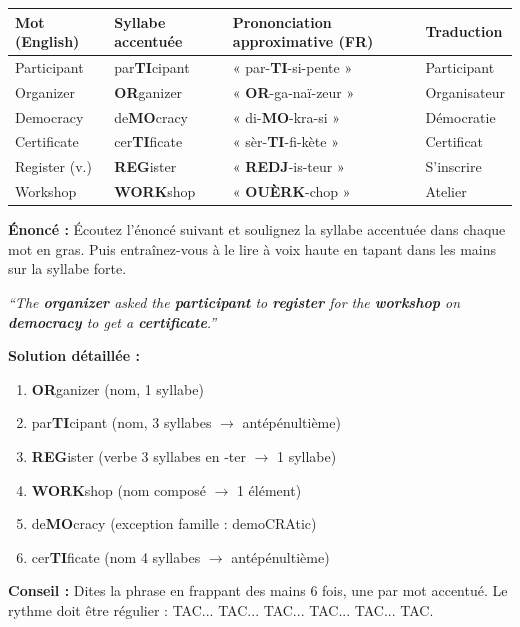 \documentclass[11pt]{article}
\newcommand{\cle}[1]{{\popxbold\color{popdark}#1}}
\begin{document}
\begin{center}
\begin{tabularx}{\linewidth}{|X|X|X|X|}
\hline
\rowcolor{popblueL} \textbf{Mot (English)} & \textbf{Syllabe accentuée} & \textbf{Prononciation approximative (FR)} & \textbf{Traduction} \\
\hline
Participant & par\textbf{TI}cipant & « par-\textbf{TI}-si-pente » & Participant \\
\hline
Organizer & \textbf{OR}ganizer & « \textbf{OR}-ga-naï-zeur » & Organisateur \\
\hline
Democracy & de\textbf{MO}cracy & « di-\textbf{MO}-kra-si » & Démocratie \\
\hline
Certificate & cer\textbf{TI}ficate & « sèr-\textbf{TI}-fi-kète » & Certificat \\
\hline
Register (v.) & \textbf{REG}ister & « \textbf{REDJ}-is-teur » & S'inscrire \\
\hline
Workshop & \textbf{WORK}shop & « \textbf{OUÈRK}-chop » & Atelier \\
\hline
\end{tabularx}
\end{center}

\begin{exoresolu}
\textbf{Énoncé :} Écoutez l'énoncé suivant et soulignez la syllabe accentuée dans chaque mot en gras. Puis entraînez-vous à le lire à voix haute en tapant dans les mains sur la syllabe forte.

\textit{``The \textbf{organizer} asked the \textbf{participant} to \textbf{register} for the \textbf{workshop} on \textbf{democracy} to get a \textbf{certificate}.''}

\tcblower
\textbf{Solution détaillée :}
\begin{enumerate}
    \item \textbf{OR}ganizer (nom, 1 syllabe)
    \item par\textbf{TI}cipant (nom, 3 syllabes $\to$ antépénultième)
    \item \textbf{REG}ister (verbe 3 syllabes en -ter $\to$ 1 syllabe)
    \item \textbf{WORK}shop (nom composé $\to$ 1 élément)
    \item de\textbf{MO}cracy (exception famille : demo\cle{CRA}tic)
    \item cer\textbf{TI}ficate (nom 4 syllabes $\to$ antépénultième)
\end{enumerate}
\textbf{Conseil :} Dites la phrase en frappant des mains 6 fois, une par mot accentué. Le rythme doit être régulier : \textsc{TAC}... \textsc{TAC}... \textsc{TAC}... \textsc{TAC}... \textsc{TAC}... \textsc{TAC}.
\end{exoresolu}
\end{document}
